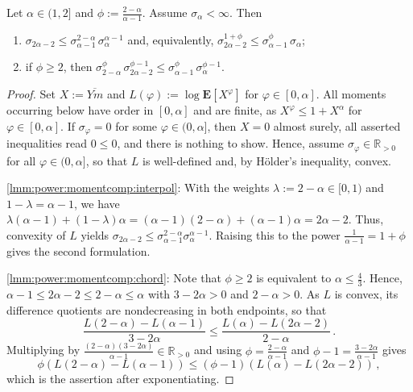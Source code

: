 \documentclass{article}
\newcommand{\R}{\mathbb{R}}
\newcommand{\Rpp}{\R_{>0}}
\newcommand{\lab}{\left[} %
\newcommand{\rab}{\right]} %
\newcommand{\ab}[1]{\lab #1 \rab} %
\newcommand{\abOf}[1]{\!\ab{#1}} %
\newcommand{\lb}{\left(} %
\newcommand{\rb}{\right)} %
\newcommand{\br}[1]{\lb #1 \rb} %
\newcommand{\E}{\mathbf{E}} %
\newcommand{\EOf}[1]{\E\abOf{#1}}
\newcommand{\eqcm}{\,,} %
\newcommand{\eqfs}{\,.}
\newcommand{\ol}[2]{\overline{#1#2}}
\begin{document}
%
\begin{lemma}\label{lmm:power:momentcomp}
    Let $\alpha\in(1,2]$ and $\phi := \frac{2-\alpha}{\alpha-1}$. Assume $\sigma_\alpha<\infty$. Then
    \begin{enumerate}[label=(\roman*)]
        \item \label{lmm:power:momentcomp:interpol}
        $\sigma_{2\alpha-2} \leq \sigma_{\alpha-1}^{2-\alpha}\,\sigma_{\alpha}^{\alpha-1}$
        and, equivalently,
        $\sigma_{2\alpha-2}^{1+\phi} \leq \sigma_{\alpha-1}^{\phi}\,\sigma_{\alpha}$;
        \item \label{lmm:power:momentcomp:chord}
        if $\phi\geq2$, then
        $\sigma_{2-\alpha}^{\phi}\,\sigma_{2\alpha-2}^{\phi-1} \leq \sigma_{\alpha-1}^{\phi}\,\sigma_{\alpha}^{\phi-1}$.
    \end{enumerate}
\end{lemma}
%
\begin{proof}
    Set $X := \ol Ym$ and $L(\varphi) := \log \EOf{X^\varphi}$ for $\varphi\in[0,\alpha]$.
    All moments occurring below have order in $[0,\alpha]$ and are finite, as $X^\varphi \leq 1 + X^\alpha$ for $\varphi\in[0,\alpha]$.
    If $\sigma_\varphi = 0$ for some $\varphi\in(0,\alpha]$, then $X=0$ almost surely, all asserted inequalities read $0\leq0$, and there is nothing to show. Hence, assume $\sigma_\varphi\in\Rpp$ for all $\varphi \in (0,\alpha]$, so that $L$ is well-defined and, by H\"older's inequality, convex.
    
    \ref{lmm:power:momentcomp:interpol}:
    With the weights $\lambda := 2-\alpha \in[0,1)$ and $1-\lambda = \alpha-1$, we have
    $\lambda (\alpha-1) + (1-\lambda) \alpha = (\alpha-1)(2-\alpha) + (\alpha-1)\alpha = 2\alpha-2$.
    Thus, convexity of $L$ yields $\sigma_{2\alpha-2} \leq \sigma_{\alpha-1}^{2-\alpha}\sigma_{\alpha}^{\alpha-1}$.
    Raising this to the power $\frac1{\alpha-1} = 1+\phi$ gives the second formulation.
    
    \ref{lmm:power:momentcomp:chord}:
    Note that $\phi\geq2$ is equivalent to $\alpha\leq\frac43$. Hence,
    $\alpha - 1 \leq 2\alpha-2 \leq 2-\alpha \leq \alpha$ with $3-2\alpha>0$ and $2-\alpha>0$.
    As $L$ is convex, its difference quotients are nondecreasing in both endpoints, so that
    \begin{equation}
        \frac{L(2-\alpha) - L(\alpha-1)}{3-2\alpha}
        \leq
        \frac{L(\alpha) - L(2\alpha-2)}{2-\alpha}
        \eqfs
    \end{equation}
    Multiplying by $\frac{(2-\alpha)(3-2\alpha)}{\alpha-1} \in \Rpp$ and using
    $\phi = \frac{2-\alpha}{\alpha-1}$ and $\phi - 1 = \frac{3-2\alpha}{\alpha-1}$ gives
    \begin{equation}
        \phi\br{L(2-\alpha) - L(\alpha-1)} \leq (\phi-1)\br{L(\alpha) - L(2\alpha-2)}
        \eqcm
    \end{equation}
    which is the assertion after exponentiating.
\end{proof}
\end{document}
